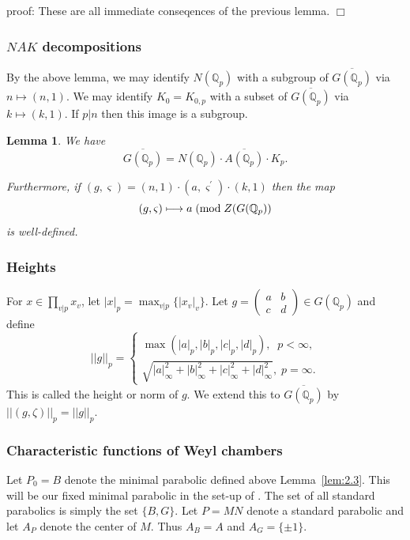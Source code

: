 \documentclass[12pt]{article}
\numberwithin{equation}{section}
\newtheorem{lemma}[theorem]{Lemma}
\def\qqq{\mathbb{Q}}
\begin{document}
proof: These are all immediate conseqences of the previous lemma. $\Box $

\subsubsection{$NAK$ decompositions}

By the above lemma, we may identify $N(\qqq_p)$ with a subgroup of $%
\overline{G(\qqq_p)}$ via $n\longmapsto (n,1)$. We may identify $%
K_0=K_{0,p}$ with a subset of $\overline{G(\qqq_p)}$ via $k\longmapsto
(k,1)$. If $p|n$ then this image is a subgroup.

\begin{lemma}\label{lem:2.4}
We have 
\[
\overline{G(\qqq_p)}=N(\qqq_p)\cdot \overline{A(\qqq_p)}\cdot K_p.
\]

Furthermore, if $(g,\varsigma )=(n,1)\cdot (a,\varsigma ^{\prime })\cdot
(k,1)$ then the map 
\[
(g,\varsigma )\longmapsto a\;({\rm mod}\;Z(G(\qqq_p))
\]
is well-defined.
\end{lemma}

\subsubsection{Heights}

For $x\in \prod_{v|p}x_v$, let $|x|_p={\max }_{v | p}\{|x_v|_v\}$.
Let $g=\left( 
\begin{array}{cc}
a & b \\ 
c & d
\end{array}
\right) \in G(\qqq_p)$ and define 
\[
||g||_p=\left\{ 
\begin{array}{c}
\max (|a|_p,|b|_p,|c|_p,|d|_p),\;\;p<\infty , \\ 
\sqrt{|a|_\infty ^2+|b|_\infty ^2+|c|_\infty ^2+|d|_\infty ^2},\;p=\infty .
\end{array}
\right. 
\]
This is called the height or norm of $g$. We extend this to
$\overline{G({\qqq}_p)}$ by $||(g,\zeta)||_p=||g||_p$.

\subsubsection{Characteristic functions of Weyl chambers}

Let $P_0=B$ denote the minimal parabolic defined above Lemma~\ref{lem:2.3}.
This will be our fixed
minimal parabolic in the set-up of \cite{A2,A3}. The set of all standard
parabolics is simply the set $\{B,G\}$. Let $P=MN$ denote a standard
parabolic and let $A_P$ denote the center of $M$. Thus $A_B=A$ and
$A_G=\{\pm 1\}$.
\end{document}
